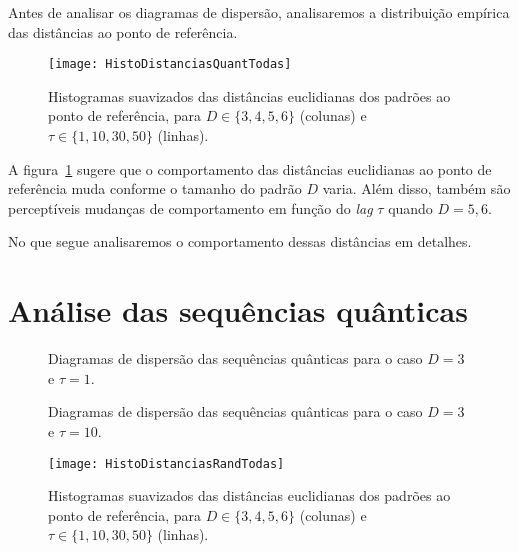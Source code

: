 Antes de analisar os diagramas de dispersão, analisaremos a distribuição empírica das distâncias ao ponto de referência.

\begin{figure}[hbt]
\centering
\texttt{[image: HistoDistanciasQuantTodas]}
\caption{Histogramas suavizados das distâncias euclidianas dos padrões ao ponto de referência, para $D\in\{3,4,5,6\}$ (colunas) e $\tau\in\{1,10,30,50\}$ (linhas).}\label{Fig:HistoDistanciasQuantTodas}
\end{figure}

A figura~\ref{Fig:HistoDistanciasQuantTodas} sugere que o comportamento das distâncias euclidianas ao ponto de referência muda conforme o tamanho do padrão $D$ varia.
Além disso, também são perceptíveis mudanças de comportamento em função do \textit{lag} $\tau$ quando $D=5,6$.

No que segue analisaremos o comportamento dessas distâncias em detalhes.

\section{Análise das sequências quânticas}

\begin{figure}
\centering
{}
\caption{Diagramas de dispersão das sequências quânticas para o caso $D=3$ e $\tau=1$.}\label{Fig:QuantD3tau1}
\end{figure}

\begin{figure}
\centering
{}
\caption{Diagramas de dispersão das sequências quânticas para o caso $D=3$ e $\tau=10$.}\label{Fig:QuantD3tau10}
\end{figure}

\begin{figure}[hbt]
	\centering
	\texttt{[image: HistoDistanciasRandTodas]}
	\caption{Histogramas suavizados das distâncias euclidianas dos padrões ao ponto de referência, para $D\in\{3,4,5,6\}$ (colunas) e $\tau\in\{1,10,30,50\}$ (linhas).}\label{Fig:HistoDistanciasRandTodas}
\end{figure}



